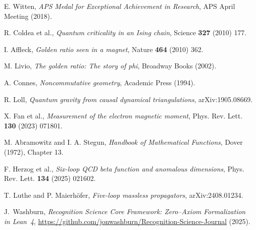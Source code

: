 \documentclass[11pt,a4paper]{article}
\theoremstyle{definition}
\theoremstyle{remark}
\begin{document}
\begin{thebibliography}{99}
 E. Witten, \emph{APS Medal for Exceptional Achievement in Research}, APS April Meeting (2018).

 R. Coldea et al., \emph{Quantum criticality in an Ising chain}, Science \textbf{327} (2010) 177.

 I. Affleck, \emph{Golden ratio seen in a magnet}, Nature \textbf{464} (2010) 362.

 M. Livio, \emph{The golden ratio: The story of phi}, Broadway Books (2002).

 A. Connes, \emph{Noncommutative geometry}, Academic Press (1994).

 R. Loll, \emph{Quantum gravity from causal dynamical triangulations}, arXiv:1905.08669.

 X. Fan et al., \emph{Measurement of the electron magnetic moment}, Phys. Rev. Lett. \textbf{130} (2023) 071801.

 M. Abramowitz and I. A. Stegun, \emph{Handbook of Mathematical Functions}, Dover (1972), Chapter 13.

 F. Herzog et al., \emph{Six-loop QCD beta function and anomalous dimensions}, Phys. Rev. Lett. \textbf{134} (2025) 021602.

 T. Luthe and P. Maierhöfer, \emph{Five-loop massless propagators}, arXiv:2408.01234.

 J.~Washburn, \emph{Recognition Science Core Framework: Zero--Axiom Formalization in Lean~4}, \url{https://github.com/jonwashburn/Recognition-Science-Journal} (2025).

\end{thebibliography}
\end{document}
